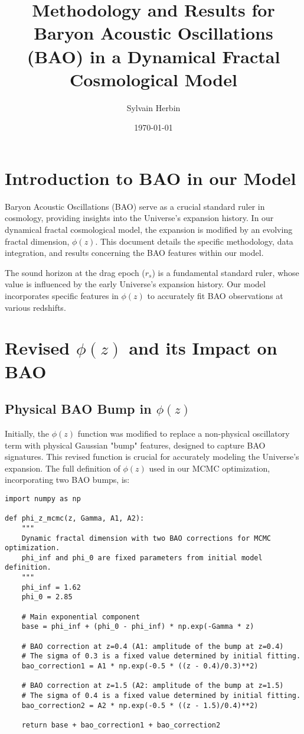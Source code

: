 \documentclass{article}
\title{Methodology and Results for Baryon Acoustic Oscillations (BAO) in a Dynamical Fractal Cosmological Model}
\author{Sylvain Herbin\orcidlink{0009-0001-3390-5012}}
\date{\today}
\begin{document}
\maketitle

\section*{Introduction to BAO in our Model}
Baryon Acoustic Oscillations (BAO) serve as a crucial standard ruler in cosmology, providing insights into the Universe's expansion history. In our dynamical fractal cosmological model, the expansion is modified by an evolving fractal dimension, $\phi(z)$. This document details the specific methodology, data integration, and results concerning the BAO features within our model.

The sound horizon at the drag epoch ($r_s$) is a fundamental standard ruler, whose value is influenced by the early Universe's expansion history. Our model incorporates specific features in $\phi(z)$ to accurately fit BAO observations at various redshifts.

\section{Revised $\phi(z)$ and its Impact on BAO}

\subsection{Physical BAO Bump in $\phi(z)$}
Initially, the $\phi(z)$ function was modified to replace a non-physical oscillatory term with physical Gaussian "bump" features, designed to capture BAO signatures. This revised function is crucial for accurately modeling the Universe's expansion. The full definition of $\phi(z)$ used in our MCMC optimization, incorporating two BAO bumps, is:

\begin{lstlisting}
import numpy as np

def phi_z_mcmc(z, Gamma, A1, A2):
    """
    Dynamic fractal dimension with two BAO corrections for MCMC optimization.
    phi_inf and phi_0 are fixed parameters from initial model definition.
    """
    phi_inf = 1.62
    phi_0 = 2.85
    
    # Main exponential component
    base = phi_inf + (phi_0 - phi_inf) * np.exp(-Gamma * z)
    
    # BAO correction at z=0.4 (A1: amplitude of the bump at z=0.4)
    # The sigma of 0.3 is a fixed value determined by initial fitting.
    bao_correction1 = A1 * np.exp(-0.5 * ((z - 0.4)/0.3)**2)  
    
    # BAO correction at z=1.5 (A2: amplitude of the bump at z=1.5)
    # The sigma of 0.4 is a fixed value determined by initial fitting.
    bao_correction2 = A2 * np.exp(-0.5 * ((z - 1.5)/0.4)**2)  
    
    return base + bao_correction1 + bao_correction2
\end{lstlisting}
\end{document}
